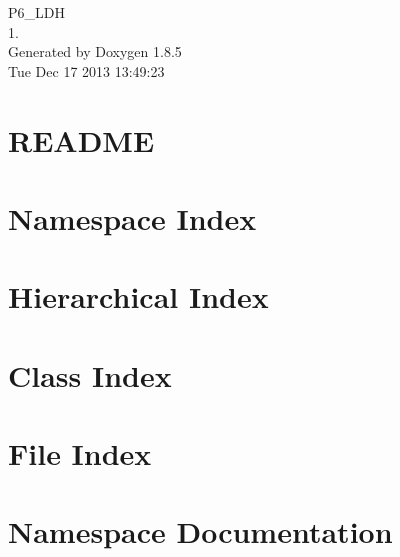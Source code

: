 \documentclass[twoside]{book}
\newcommand{\clearemptydoublepage}{%
  \newpage{\pagestyle{empty}\cleardoublepage}%
}
\begin{document}
\hypersetup{pageanchor=false}
\begin{titlepage}
\vspace*{7cm}
\begin{center}%
{\Large P6\-\_\-\-L\-D\-H \\[1ex]\large 1. }\\
\vspace*{1cm}
{\large Generated by Doxygen 1.8.5}\\
\vspace*{0.5cm}
{\small Tue Dec 17 2013 13:49:23}\\
\end{center}
\end{titlepage}
\clearemptydoublepage
\tableofcontents
\clearemptydoublepage
{}
\hypersetup{pageanchor=true}

\chapter{R\-E\-A\-D\-M\-E}
\label{md__r_e_a_d_m_e}
\hypertarget{md__r_e_a_d_m_e}{}

\chapter{Namespace Index}

\chapter{Hierarchical Index}

\chapter{Class Index}

\chapter{File Index}

\chapter{Namespace Documentation}










\end{document}
